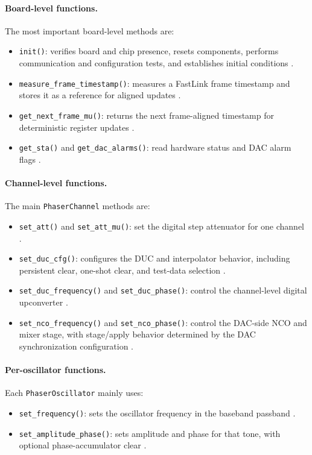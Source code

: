 \paragraph{Board-level functions.}
The most important board-level methods are:
\begin{itemize}
    \item \texttt{init()}: verifies board and chip presence, resets components, performs communication and configuration tests, and establishes initial conditions \cite{artiq_coredrivers}.
    \item \texttt{measure\_frame\_timestamp()}: measures a FastLink frame timestamp and stores it as a reference for aligned updates \cite{artiq_coredrivers}.
    \item \texttt{get\_next\_frame\_mu()}: returns the next frame-aligned timestamp for deterministic register updates \cite{artiq_coredrivers}.
    \item \texttt{get\_sta()} and \texttt{get\_dac\_alarms()}: read hardware status and DAC alarm flags \cite{artiq_coredrivers}.
\end{itemize}

\paragraph{Channel-level functions.}
The main \texttt{PhaserChannel} methods are:
\begin{itemize}
    \item \texttt{set\_att()} and \texttt{set\_att\_mu()}: set the digital step attenuator for one channel \cite{artiq_coredrivers}.
    \item \texttt{set\_duc\_cfg()}: configures the DUC and interpolator behavior, including persistent clear, one-shot clear, and test-data selection \cite{artiq_coredrivers}.
    \item \texttt{set\_duc\_frequency()} and \texttt{set\_duc\_phase()}: control the channel-level digital upconverter \cite{artiq_coredrivers}.
    \item \texttt{set\_nco\_frequency()} and \texttt{set\_nco\_phase()}: control the DAC-side NCO and mixer stage, with stage/apply behavior determined by the DAC synchronization configuration \cite{artiq_coredrivers}.
\end{itemize}

\paragraph{Per-oscillator functions.}
Each \texttt{PhaserOscillator} mainly uses:
\begin{itemize}
    \item \texttt{set\_frequency()}: sets the oscillator frequency in the baseband passband \cite{artiq_coredrivers}.
    \item \texttt{set\_amplitude\_phase()}: sets amplitude and phase for that tone, with optional phase-accumulator clear \cite{artiq_coredrivers}.
\end{itemize}

